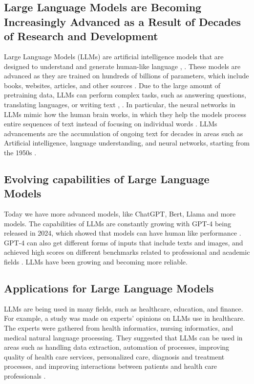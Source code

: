 \documentclass[twocolumn]{article}
\begin{document}
\subsection{Large Language Models are Becoming Increasingly Advanced as a Result of Decades of Research and Development}
Large Language Models (LLMs) are artificial intelligence models that are designed to understand and generate human-like language \cite{minaee2024large}, \cite{wang2023overview}. These models are advanced as they are trained on hundreds of billions of parameters, which include books, websites, articles, and other sources \cite{minaee2024large}. Due to the large amount of pretraining data, LLMs can perform complex tasks, such as answering questions, translating languages, or writing text \cite{minaee2024large}, \cite{wang2023overview}. In particular, the neural networks in LLMs mimic how the human brain works, in which they help the models process entire sequences of text instead of focusing on individual words \cite{wang2023overview}. LLMs advancements are the accumulation of ongoing text for decades in areas such as Artificial intelligence, language understanding, and neural networks, starting from the 1950s \cite{minaee2024large}. 
\subsection{Evolving capabilities of Large Language Models}
Today we have more advanced models, like ChatGPT, Bert, Llama and more models. The capabilities of LLMs are constantly growing with GPT-4 being released in 2024, which showed that models can have human like performance \cite{brown2023gpt4}. GPT-4 can also get different forms of inputs that include texts and images, and achieved high scores on different benchmarks related to professional and academic fields \cite{brown2023gpt4}. LLMs have been growing and becoming more reliable. 
\subsection{Applications for Large Language Models}
LLMs are being used in many fields, such as healthcare, education, and finance. For example, a study was made on experts’ opinions on LLMs use in healthcare. The experts were gathered from health informatics, nursing informatics, and medical natural language processing. They suggested that LLMs can be used in areas such as handling data extraction, automation of processes, improving quality of health care services, personalized care, diagnosis and treatment processes, and improving interactions between patients and health care professionals
\cite{denecke2024potential}. 
 
\end{document}
